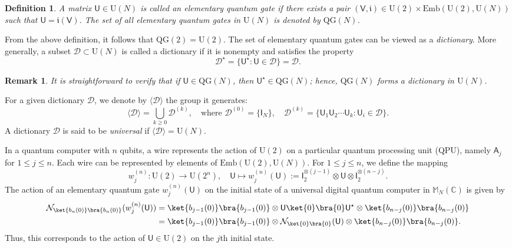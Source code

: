 \documentclass[a4paper,11pt]{article}
\newtheorem{definition}[theorem]{Definition}
\newtheorem{remark}[theorem]{Remark}
\newcommand{\rI}{\mathsf{I}}
\newcommand{\rU}{\mathsf{U}}
\newcommand{\rV}{\mathsf{V}}
\newcommand{\rA}{\mathsf{A}}
\begin{document}
\begin{definition}
A matrix \(\rU \in \mathrm{U}(N)\) is called an \emph{elementary quantum gate} if there exists a pair \((\rV, \mathfrak{i}) \in \mathrm{U}(2) \times \mathrm{Emb}(\mathrm{U}(2),\mathrm{U}(N))\) such that \(\rU = \mathfrak{i}(\rV)\). The set of all elementary quantum gates in \(\mathrm{U}(N)\) is denoted by \(\mathrm{QG}(N)\).
\end{definition}

From the above definition, it follows that \(\mathrm{QG}(2) = \mathrm{U}(2)\). 
The set of elementary quantum gates can be viewed as a \emph{dictionary}. 
More generally, a subset \(\mathcal{D} \subset \mathrm{U}(N)\) is called a dictionary 
if it is nonempty and satisfies the property
\[
\mathcal{D}^{\star} = \{ \rU^{\star} : \rU \in \mathcal{D} \} = \mathcal{D}.
\]

\begin{remark}
It is straightforward to verify that if \(\rU \in \mathrm{QG}(N)\), then \(\rU^{\star} \in \mathrm{QG}(N)\); hence, \(\mathrm{QG}(N)\) forms a dictionary in \(\mathrm{U}(N)\).
\end{remark}

For a given dictionary \(\mathcal{D}\), we denote by \(\langle \mathcal{D} \rangle\) the group it generates:
\[
\langle \mathcal{D} \rangle = \bigcup_{k \geq 0} \mathcal{D}^{(k)}, \quad \text{where } \mathcal{D}^{(0)} = \{\rI_N\}, \quad \mathcal{D}^{(k)} = \{\rU_1 \rU_2 \cdots \rU_k : \rU_i \in \mathcal{D} \}.
\]
A dictionary \(\mathcal{D}\) is said to be \emph{universal} if \(\langle \mathcal{D} \rangle = \mathrm{U}(N)\).

\bigskip

In a quantum computer with \(n\) qubits, a wire represents the action of \(\mathrm{U}(2)\) on a particular quantum processing unit (QPU), namely \(\rA_j\) for \(1 \leq j \leq n\). Each wire can be represented by elements of \(\mathrm{Emb}(\mathrm{U}(2),\mathrm{U}(N))\). For \(1 \leq j \leq n\), we define the mapping
\[
w_j^{(n)} : \mathrm{U}(2) \to \mathrm{U}(2^n), \quad \rU \mapsto w_j^{(n)}(\rU) := \rI_2^{\otimes (j-1)} \otimes \rU \otimes \rI_2^{\otimes (n-j)}.
\]
The action of an elementary quantum gate \(w_j^{(n)}(\rU)\) on the initial state of a universal digital quantum computer in \(\mathbb{M}_N(\mathbb{C})\) is given by
\begin{align*}
\mathcal{N}_{\ket{b_n(0)}\bra{b_n(0)}}(w_j^{(n)}(\rU))
& = \ket{b_{j-1}(0)} \bra{b_{j-1}(0)} \otimes \rU \ket{0}\bra{0} \rU^{\star} \otimes \ket{b_{n-j}(0)} \bra{b_{n-j}(0)} \\ 
& = \ket{b_{j-1}(0)} \bra{b_{j-1}(0)} \otimes \mathcal{N}_{\ket{0}\bra{0}}(\rU) \otimes \ket{b_{n-j}(0)} \bra{b_{n-j}(0)}.
\end{align*}
Thus, this corresponds to the action of \(\rU \in \mathrm{U}(2)\) on the \(j\)th initial state. 
\end{document}
